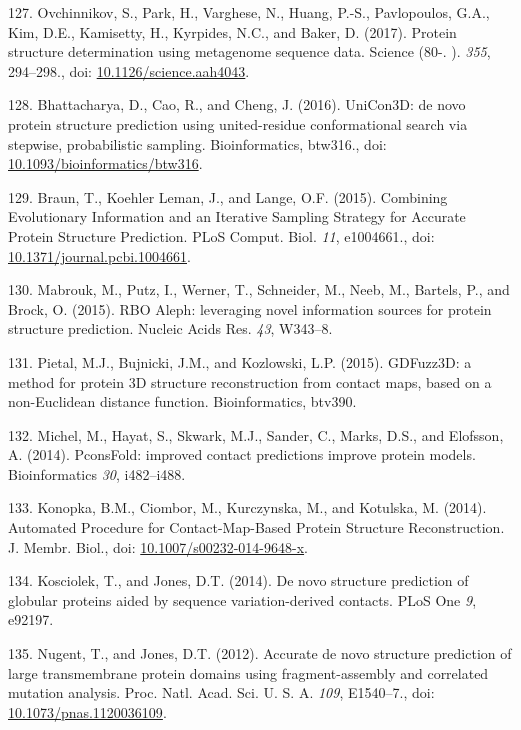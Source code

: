 \documentclass[11pt,a4paper,twoside]{book}
\theoremstyle{definition}
\theoremstyle{definition}
\theoremstyle{remark}
\begin{document}
\hypertarget{ref-Ovchinnikov2017}{}
127. Ovchinnikov, S., Park, H., Varghese, N., Huang, P.-S., Pavlopoulos,
G.A., Kim, D.E., Kamisetty, H., Kyrpides, N.C., and Baker, D. (2017).
Protein structure determination using metagenome sequence data. Science
(80-. ). \emph{355}, 294--298., doi:
\href{https://doi.org/10.1126/science.aah4043}{10.1126/science.aah4043}.

\hypertarget{ref-Bhattacharya2016}{}
128. Bhattacharya, D., Cao, R., and Cheng, J. (2016). UniCon3D: de novo
protein structure prediction using united-residue conformational search
via stepwise, probabilistic sampling. Bioinformatics, btw316., doi:
\href{https://doi.org/10.1093/bioinformatics/btw316}{10.1093/bioinformatics/btw316}.

\hypertarget{ref-Braun2015}{}
129. Braun, T., Koehler Leman, J., and Lange, O.F. (2015). Combining
Evolutionary Information and an Iterative Sampling Strategy for Accurate
Protein Structure Prediction. PLoS Comput. Biol. \emph{11}, e1004661.,
doi:
\href{https://doi.org/10.1371/journal.pcbi.1004661}{10.1371/journal.pcbi.1004661}.

\hypertarget{ref-Mabrouk2015a}{}
130. Mabrouk, M., Putz, I., Werner, T., Schneider, M., Neeb, M.,
Bartels, P., and Brock, O. (2015). RBO Aleph: leveraging novel
information sources for protein structure prediction. Nucleic Acids Res.
\emph{43}, W343--8.

\hypertarget{ref-Pietal2015a}{}
131. Pietal, M.J., Bujnicki, J.M., and Kozlowski, L.P. (2015). GDFuzz3D:
a method for protein 3D structure reconstruction from contact maps,
based on a non-Euclidean distance function. Bioinformatics, btv390.

\hypertarget{ref-Michel2014}{}
132. Michel, M., Hayat, S., Skwark, M.J., Sander, C., Marks, D.S., and
Elofsson, A. (2014). PconsFold: improved contact predictions improve
protein models. Bioinformatics \emph{30}, i482--i488.

\hypertarget{ref-Konopka2014}{}
133. Konopka, B.M., Ciombor, M., Kurczynska, M., and Kotulska, M.
(2014). Automated Procedure for Contact-Map-Based Protein Structure
Reconstruction. J. Membr. Biol., doi:
\href{https://doi.org/10.1007/s00232-014-9648-x}{10.1007/s00232-014-9648-x}.

\hypertarget{ref-Kosciolek2014}{}
134. Kosciolek, T., and Jones, D.T. (2014). De novo structure prediction
of globular proteins aided by sequence variation-derived contacts. PLoS
One \emph{9}, e92197.

\hypertarget{ref-Nugent2012}{}
135. Nugent, T., and Jones, D.T. (2012). Accurate de novo structure
prediction of large transmembrane protein domains using
fragment-assembly and correlated mutation analysis. Proc. Natl. Acad.
Sci. U. S. A. \emph{109}, E1540--7., doi:
\href{https://doi.org/10.1073/pnas.1120036109}{10.1073/pnas.1120036109}.
\end{document}
